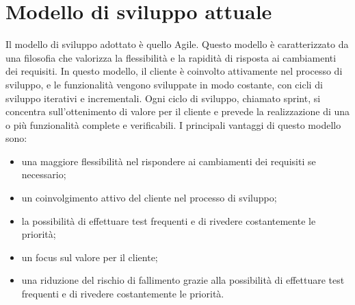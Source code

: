 \section{Modello di sviluppo attuale}
Il modello di sviluppo adottato è quello Agile. Questo modello è caratterizzato da una filosofia che valorizza la flessibilità e la rapidità
di risposta ai cambiamenti dei requisiti. In questo modello, il cliente è coinvolto attivamente
nel processo di sviluppo, e le funzionalità vengono sviluppate in modo costante, con cicli di sviluppo
iterativi e incrementali. Ogni ciclo di sviluppo, chiamato sprint, si concentra sull'ottenimento
di valore per il cliente e prevede la realizzazione di una o più funzionalità complete e verificabili.
I principali vantaggi di questo modello sono:
\begin{itemize}
    \item una maggiore flessibilità nel rispondere ai cambiamenti dei requisiti se necessario;
    \item un coinvolgimento attivo del cliente nel processo di sviluppo;
    \item la possibilità di effettuare test frequenti e di rivedere costantemente le priorità;
    \item un focus sul valore per il cliente;
    \item una riduzione del rischio di fallimento grazie alla possibilità di effettuare test frequenti e di rivedere costantemente le priorità.
\end{itemize}